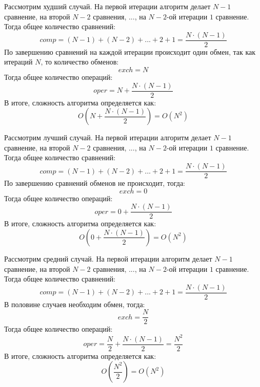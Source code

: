 Рассмотрим худший случай. На первой итерации алгоритм делает $N-1$ сравнение, на второй $N-2$ сравнения, ..., на $N-2$-ой итерации $1$ сравнение. Тогда общее количество сравнений:
\begin{equation}
	comp = (N-1) + (N-2) + ... + 2 + 1 = \frac{N \cdot (N-1)}{2}
\end{equation}
По завершению сравнений на каждой итерации происходит один обмен, так как итераций $N$, то количество обменов:
\begin{equation}
	exch = N
\end{equation}
Тогда общее количество операций:
\begin{equation}
	oper = N + \frac{N \cdot (N-1)}{2}
\end{equation}
В итоге, сложность алгоритма определяется как:
\begin{equation}
	O(N + \frac{N \cdot (N-1)}{2}) = O(N^2)
\end{equation}

Рассмотрим лучший случай. На первой итерации алгоритм делает $N-1$ сравнение, на второй $N-2$ сравнения, ..., на $N-2$-ой итерации $1$ сравнение. Тогда общее количество сравнений:
\begin{equation}
	comp = (N-1) + (N-2) + ... + 2 + 1 = \frac{N \cdot (N-1)}{2}
\end{equation}
По завершению сравнений обменов не происходит, тогда:
\begin{equation}
	exch = 0
\end{equation}
Тогда общее количество операций:
\begin{equation}
	oper = 0 + \frac{N \cdot (N-1)}{2}
\end{equation}
В итоге, сложность алгоритма определяется как:
\begin{equation}
	O(0 + \frac{N \cdot (N-1)}{2}) = O(N^2)
\end{equation}

Рассмотрим средний случай. На первой итерации алгоритм делает $N-1$ сравнение, на второй $N-2$ сравнения, ..., на $N-2$-ой итерации $1$ сравнение. Тогда общее количество сравнений:
\begin{equation}
	comp = (N-1) + (N-2) + ... + 2 + 1 = \frac{N \cdot (N-1)}{2}
\end{equation}
В половине случаев необходим обмен, тогда:
\begin{equation}
	exch = \frac{N}{2}
\end{equation}
Тогда общее количество операций:
\begin{equation}
	oper = \frac{N}{2} + \frac{N \cdot (N-1)}{2} = \frac{N^2}{2}
\end{equation}
В итоге, сложность алгоритма определяется как:
\begin{equation}
	O(\frac{N^2}{2}) = O(N^2)
\end{equation}


